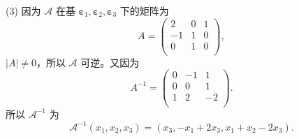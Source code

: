 \begin{enumerate}[1~]
\begin{solution}
(3) 因为 $\mathscr{A}$ 在基 $\boldsymbol{\varepsilon}_1, \boldsymbol{\varepsilon}_2, \boldsymbol{\varepsilon}_3$ 下的矩阵为
$$
A=\left( \begin{matrix}
	2&		0&		1\\
	-1&		1&		0\\
	0&		1&		0\\
\end{matrix} \right),
$$
$|A|\ne 0$，所以 $\mathscr{A}$ 可逆。又因为 \[
A^{-1}=\left( \begin{matrix}
	0&		-1&		1\\
	0&		0&		1\\
	1&		2&		-2\\
\end{matrix} \right).
\]
所以 $\mathscr{A}^{-1}$ 为
\[
\mathscr{A}^{-1} (x_1, x_2, x_3) = (x_3, -x_1 + 2 x_3, x_1 + x_2 - 2 x_3 ).
\]
\end{solution}


\end{enumerate}
